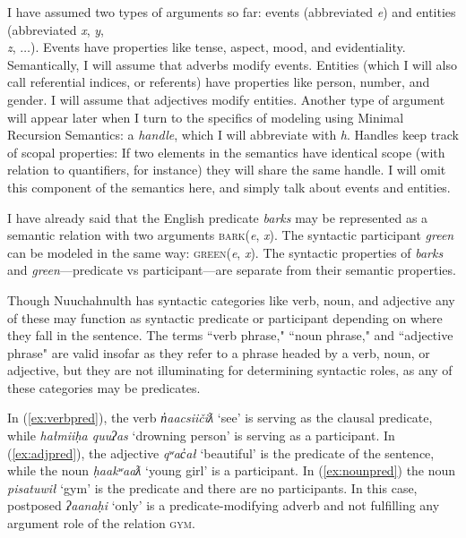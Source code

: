 I have assumed two types of arguments so far: events (abbreviated \textit{e}) and entities (abbreviated \textit{x}, \textit{y}, \\ \textit{z}, $\ldots$). Events have properties like tense, aspect, mood, and evidentiality. Semantically, I will assume that adverbs modify events. Entities (which I will also call referential indices, or referents) have properties like person, number, and gender. I will assume that adjectives modify entities. Another type of argument will appear later when I turn to the specifics of modeling using Minimal Recursion Semantics: a \textit{handle}, which I will abbreviate with \textit{h}. Handles keep track of scopal properties: If two elements in the semantics have identical scope (with relation to quantifiers, for instance) they will share the same handle. I will omit this component of the semantics here, and simply talk about events and entities.

I have already said that the English predicate \textit{barks} may be represented as a semantic relation with two arguments \textsc{bark}(\textit{e}, \textit{x}). The syntactic participant \textit{green} can be modeled in the same way: \textsc{green}(\textit{e}, \textit{x}). The syntactic properties of \textit{barks} and \textit{green}---predicate vs participant---are separate from their semantic properties.

Though Nuuchahnulth has syntactic categories like verb, noun, and adjective \citep{jacobsen1979, wojdak2001, davidson2002, inmanwerle2016b} any of these may function as syntactic predicate or participant depending on where they fall in the sentence. The terms ``verb phrase," ``noun phrase," and ``adjective phrase" are valid insofar as they refer to a phrase headed by a verb, noun, or adjective, but they are not illuminating for determining syntactic roles, as any of these categories may be predicates.

In (\ref{ex:verbpred}), the verb \textit{n̓aacsiičiƛ} `see' is serving as the clausal predicate, while \textit{hałmiiḥa quuʔas} `drowning person' is serving as a participant. In (\ref{ex:adjpred}), the adjective \textit{qʷac̓ał} `beautiful' is the predicate of the sentence, while the noun \textit{ḥaakʷaaƛ} `young girl' is a participant. In (\ref{ex:nounpred}) the noun \textit{pisatuwił} `gym' is the predicate and there are no participants. In this case, postposed \textit{ʔaanaḥi} `only' is a predicate-modifying adverb and not fulfilling any argument role of the relation \textsc{gym}.

